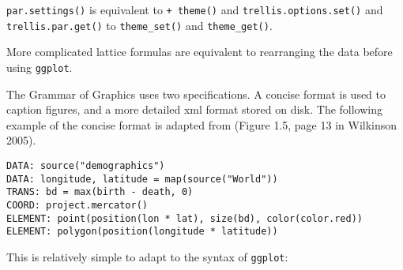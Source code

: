 \begin{Shaded}
\begin{Highlighting}[]
\StringTok{ }
   \NormalTok{, } \NormalTok{, }
   \NormalTok{)}
 
   \NormalTok{, } \NormalTok{, }
   \NormalTok{)}

\StringTok{ } \NormalTok{) }
  \NormalTok{)}
\end{Highlighting}
\end{Shaded}

\texttt{par.settings()} is equivalent to \texttt{+ theme()} and
\texttt{trellis.options.set()} and \texttt{trellis.par.get()} to
\texttt{theme\_set()} and \texttt{theme\_get()}.

More complicated lattice formulas are equivalent to rearranging the data
before using \texttt{ggplot}.


The Grammar of Graphics uses two specifications. A concise format is
used to caption figures, and a more detailed xml format stored on disk.
The following example of the concise format is adapted from (Figure 1.5,
page 13 in Wilkinson 2005). 

\begin{verbatim}
DATA: source("demographics")
DATA: longitude, latitude = map(source("World"))
TRANS: bd = max(birth - death, 0)
COORD: project.mercator()
ELEMENT: point(position(lon * lat), size(bd), color(color.red))
ELEMENT: polygon(position(longitude * latitude))
\end{verbatim}

This is relatively simple to adapt to the syntax of \texttt{ggplot}:


